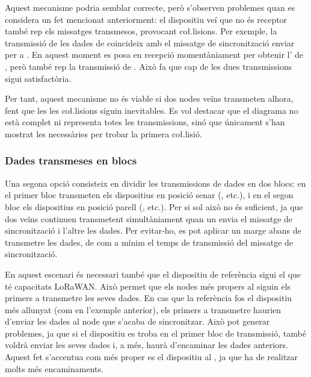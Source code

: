 \documentclass{tfgitic}[2024/07/01]
\begin{document}
{Aquest mecanisme podria semblar correcte, però s'observen problemes quan es considera un fet mencionat anteriorment: el dispositiu veí que no és receptor també rep els missatges transmesos, provocant co\l.lisions. Per exemple, la transmissió de les dades de  coincideix amb el missatge de sincronització enviar per  a . En aquest moment  es posa en recepció momentàniament per obtenir l' de , però també rep la transmissió de . Això fa que cap de les dues transmissions sigui satisfactòria.

Per tant, aquest mecanisme no és viable si dos nodes veïns transmeten alhora, fent que les  les co\l.lisions siguin inevitables.
Es vol destacar que el diagrama no està complet ni representa totes les transmissions, sinó que únicament s'han mostrat les necessàries per trobar la primera co\l.lisió. 

\subsubsection{Dades transmeses en blocs}
Una segona opció consisteix en dividir les transmissions de dades en dos blocs: en el primer bloc transmeten els dispositius en posició senar (, etc.), i en el segon bloc els dispositius en posició parell (, etc.). Per si sol això no és suficient, ja que dos veïns continuen transmetent simultàniament quan un envia el missatge de sincronització i l'altre les dades. Per evitar-ho, es pot aplicar un marge abans de transmetre les dades, de com a mínim el temps de transmissió del missatge de sincronització. 

En aquest escenari és necessari també que el dispositiu de referència sigui el que té capacitats LoRaWAN. Això permet que els nodes més propers al  siguin els primers a transmetre les seves dades. En cas que la referència fos el dispositiu més allunyat (com en l'exemple anterior), els primers a transmetre haurien d'enviar les dades al node que s'acaba de sincronitzar. Això pot generar problemes, ja que si el dispositiu es troba en el primer bloc de transmissió, també voldrà enviar les seves dades i, a més, haurà d'encaminar les dades anteriors. Aquest fet s'accentua com més proper es el dispositiu al , ja que ha de realitzar molts més encaminaments.

}
\end{document}
